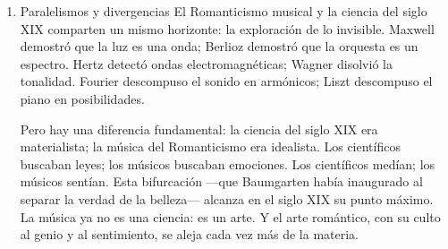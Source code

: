 \documentclass[14pt, a4paper]{article}
\begin{document}
\begin{enumerate}
Mi camino es distinto. No busco romper con la academia: busco
contribuir a ella desde una tradición filosófica —el materialismo de
la Escuela de Toledo— que puede enriquecer sus líneas de
investigación. No aspiro al aislamiento del genio incomprendido, sino
a la discusión rigurosa entre pares. No escribo aforismos: propongo un
sistema abierto, enraizado en la experiencia y dispuesto a ser
confrontado. Nietzsche es un aliado en la crítica al idealismo, pero
no es un modelo de trayectoria. Mi apuesta es otra: seguir
aprendiendo, seguir investigando, seguir haciendo música-filosofía
mientras la academia me lo permita.
\item Paralelismos y divergencias
\label{paralelismos-romanticismo}
El Romanticismo musical y la ciencia del siglo XIX comparten un mismo
horizonte: la exploración de lo invisible. Maxwell demostró que la luz
es una onda; Berlioz demostró que la orquesta es un espectro. Hertz
detectó ondas electromagnéticas; Wagner disolvió la tonalidad. Fourier
descompuso el sonido en armónicos; Liszt descompuso el piano en
posibilidades.

Pero hay una diferencia fundamental: la ciencia del siglo XIX era
materialista; la música del Romanticismo era idealista. Los científicos
buscaban leyes; los músicos buscaban emociones. Los científicos
medían; los músicos sentían. Esta bifurcación —que Baumgarten había
inaugurado al separar la verdad de la belleza— alcanza en el siglo XIX
su punto máximo. La música ya no es una ciencia: es un arte. Y el arte
romántico, con su culto al genio y al sentimiento, se aleja cada vez
más de la materia.
\end{enumerate}
\end{document}

